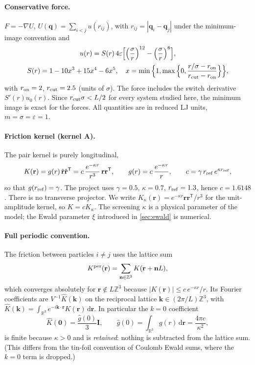 \documentclass[11pt]{article}
\DeclareRobustCommand{\_}{\textunderscore\allowbreak}
\theoremstyle{remark}
\theoremstyle{definition}
\newcommand{\bq}{\mathbf{q}}
\newcommand{\br}{\mathbf{r}}
\newcommand{\bk}{\mathbf{k}}
\newcommand{\bn}{\mathbf{n}}
\newcommand{\rhat}{\hat{\mathbf{r}}}
\newcommand{\Id}{\mathbf{I}}
\newcommand{\R}{\mathbb{R}}
\newcommand{\Z}{\mathbb{Z}}
\newcommand{\dd}{\,\mathrm{d}}
\begin{document}
\paragraph{Conservative force.}
$F=-\nabla U$, $U(\bq)=\sum_{i<j}u(r_{ij})$, with $r_{ij}=|\bq_i-\bq_j|$ under the minimum-image convention and
\begin{equation}\label{eq:lj}
\begin{gathered}
u(r)=S(r)\,4\varepsilon\Big[\Big(\frac{\sigma}{r}\Big)^{12}-\Big(\frac{\sigma}{r}\Big)^{6}\Big],\\
S(r)=1-10x^3+15x^4-6x^5,\quad x=\min\Big\{1,\max\Big\{0,\frac{r/\sigma-r_{\rm on}}{r_{\rm cut}-r_{\rm on}}\Big\}\Big\},
\end{gathered}
\end{equation}
with $r_{\rm on}=2$, $r_{\rm cut}=2.5$ (units of $\sigma$). The force includes the switch derivative $S'(r)u_0(r)$.
Since $r_{\rm cut}\sigma<L/2$ for every system studied here, the minimum image is exact for the forces. All
quantities are in reduced LJ units, $m=\sigma=\varepsilon=1$.

\paragraph{Friction kernel (kernel A).}
The pair kernel is purely longitudinal,
\begin{equation}\label{eq:kernelA}
K(\br)=g(r)\,\rhat\rhat^{\mathsf T}=c\,\frac{e^{-\kappa r}}{r^3}\,\br\br^{\mathsf T},\qquad
g(r)=c\,\frac{e^{-\kappa r}}{r},\qquad c=\gamma\,r_{\rm ref}\,e^{\kappa r_{\rm ref}},
\end{equation}
so that $g(r_{\rm ref})=\gamma$. The project uses $\gamma=0.5$, $\kappa=0.7$, $r_{\rm ref}=1.3$, hence
$c=1.6148$. There is no transverse projector. We write $K_\kappa(\br)=e^{-\kappa r}\br\br^{\mathsf T}/r^3$ for the
unit-amplitude kernel, so $K=cK_\kappa$. The screening $\kappa$ is a physical parameter of the model; the Ewald
parameter $\xi$ introduced in \cref{sec:ewald} is numerical.

\paragraph{Full periodic convention.}
The friction between particles $i\neq j$ uses the lattice sum
\begin{equation}\label{eq:Kper}
K^{\rm per}(\br)=\sum_{\bn\in\Z^3}K(\br+\bn L),
\end{equation}
which converges absolutely for $\br\notin L\Z^3$ because $|K(\br)|\le c\,e^{-\kappa r}/r$. Its Fourier
coefficients are $V^{-1}\hat K(\bk)$ on the reciprocal lattice $\bk\in(2\pi/L)\Z^3$, with
$\hat K(\bk)=\int_{\R^3}e^{-i\bk\cdot\br}K(\br)\dd\br$. In particular the $k=0$ coefficient
\begin{equation}\label{eq:k0}
\hat K(\mathbf 0)=\frac{\hat g(0)}{3}\Id,\qquad \hat g(0)=\int_{\R^3}g(r)\dd\br=\frac{4\pi c}{\kappa^2},
\end{equation}
is finite because $\kappa>0$ and is \emph{retained}: nothing is subtracted from the lattice sum. (This differs from
the tin-foil convention of Coulomb Ewald sums, where the $k=0$ term is dropped.)
\end{document}
